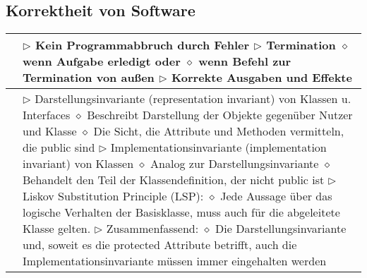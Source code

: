 \subsection{Korrektheit von Software}
	\begin{table}[H]
	\label{Korrektheit von Software}
	\begin{tabular}{ | p{4cm} p{13.5cm} | }
	

	\hline
	\makecell[l]{Überblick} & 
	\makecell[l]
	{
	$\rhd$ Kein Programmabbruch durch Fehler \\
	$\rhd$ Termination \\
	\hspace{0.4cm} $\diamond$ wenn Aufgabe erledigt oder \\
	\hspace{0.4cm} $\diamond$ wenn Befehl zur Termination von au\ss en \\
	$\rhd$ Korrekte Ausgaben und Effekte \\
	} 	\\ \hline


	\makecell[l]{Korrektheit von Klasse} & 
	\makecell[l]
	{
	$\rhd$ Darstellungsinvariante (representation invariant) von Klassen u. Interfaces \\
	\hspace{0.4cm} $\diamond$ Beschreibt Darstellung der Objekte gegenüber Nutzer und Klasse \\
	\hspace{0.4cm} $\diamond$ Die Sicht, die Attribute und Methoden vermitteln, die public sind \\
	$\rhd$ Implementationsinvariante (implementation invariant) von Klassen \\
	\hspace{0.4cm} $\diamond$ Analog zur Darstellungsinvariante \\
	\hspace{0.4cm} $\diamond$ Behandelt den Teil der Klassendefinition, der nicht public ist \\
	$\rhd$ Liskov Substitution Principle (LSP): \\
	\hspace{0.4cm} $\diamond$ Jede Aussage über das logische Verhalten der Basisklasse, \\
	\hspace{0.8cm} muss auch für die abgeleitete Klasse gelten. \\
	$\rhd$ Zusammenfassend: \\
	\hspace{0.4cm} $\diamond$ Die Darstellungsinvariante und, soweit es die protected Attribute betrifft, \\
	\hspace{0.8cm} auch die Implementationsinvariante müssen immer eingehalten werden \\
	} 	\\ \hline



\end{tabular}
\end{table}
